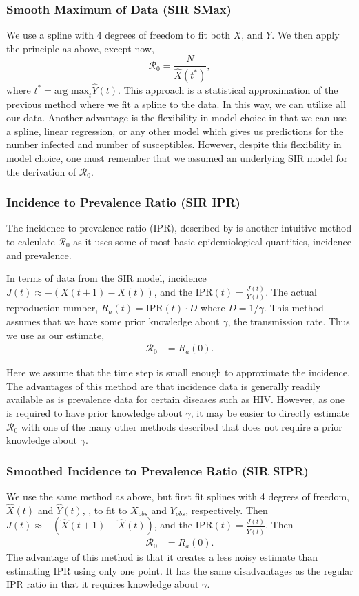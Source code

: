 \documentclass[12pt]{article}
\newcommand{\rr}{\ensuremath{\mathcal{R}_0}}
\begin{document}
\subsubsection{Smooth Maximum of Data (SIR SMax)}\label{smooth-maximum-of-data}

We use a spline with 4 degrees of freedom to fit both \(X\), and \(Y\).
We then apply the principle as above, except now,
\[\rr = \frac{N}{\hat{X}(t^*)},\] where
\(t^* = \text{arg max}_{t} \hat{Y}(t)\).   This approach is a statistical approximation of the previous method where we fit a spline to the data.  In this way, we can utilize all our data.  Another advantage is the flexibility in model choice in that we can use a spline, linear regression, or any other model which gives us predictions for the number infected and number of susceptibles.  However, despite this flexibility in model choice, one must remember that we assumed an underlying SIR model for the derivation of $\rr$.

\subsubsection{Incidence to Prevalence
  Ratio (SIR IPR)}\label{incidence-to-prevalence-ratio}
The incidence to prevalence ratio (IPR), described by \cite{Nishiura2009} is another intuitive method to calculate $\rr$ as it uses some of most basic epidemiological quantities, incidence and prevalence.

In terms of data from the SIR model, incidence $J(t) \approx -(X(t+1) - X(t))$, and the IPR$(t) = \frac{J(t)}{Y(t)}$. The actual reproduction number, $R_a(t) = \text{IPR}(t)\cdot D$ where $D = 1 /\gamma$.  This method assumes that we have some prior knowledge about $\gamma$, the transmission rate.  Thus we use as our estimate,
\begin{align*}
\rr &= R_a(0).
\end{align*}

Here we assume that the time step is small enough to approximate the incidence.  The advantages of this method are that incidence data is generally readily available as is prevalence data for certain diseases such as HIV.  However, as one is required to have prior knowledge about $\gamma$, it may be easier to directly estimate $\rr$ with one of the many other methods described that does not require a prior knowledge about $\gamma$.

\subsubsection{Smoothed Incidence to Prevalence Ratio (SIR SIPR)}
We use the same method as above, but first fit splines with 4 degrees of freedom, $\hat{X}(t)$ and $\hat{Y}(t)$, , to fit to $X_{obs}$ and $Y_{obs}$, respectively.  Then  $J(t) \approx -(\hat{X}(t+1) - \hat{X}(t))$, and the IPR$(t) = \frac{J(t)}{\hat{Y}(t)}$.  Then
\begin{align*}
\rr &= R_a(0).  
\end{align*}
The advantage of this method is that it creates a less noisy estimate than estimating IPR using only one point.  It has the same disadvantages as the regular IPR ratio in that it requires knowledge about $\gamma$.
\end{document}
